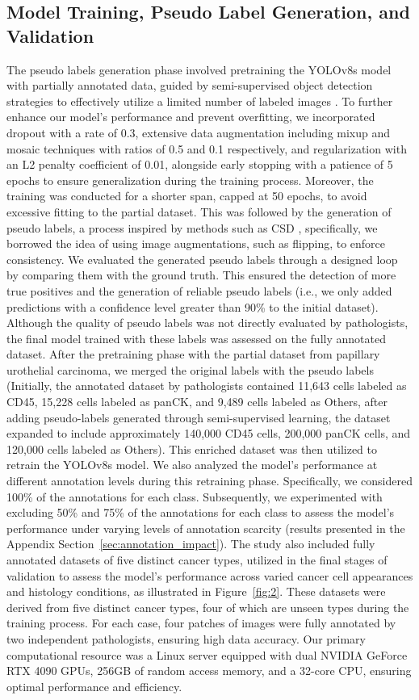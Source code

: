 \documentclass{midl} %
\begin{document}
\subsection{Model Training, Pseudo Label Generation, and Validation}
The pseudo labels generation phase involved pretraining the YOLOv8s model with partially annotated data, guided by semi-supervised object detection strategies to effectively utilize a limited number of labeled images \cite{gao2019note, jeong2019consistency}. To further enhance our model's performance and prevent overfitting, we incorporated dropout with a rate of 0.3, extensive data augmentation including mixup and mosaic techniques with ratios of 0.5 and 0.1 respectively, and regularization with an L2 penalty coefficient of 0.01, alongside early stopping with a patience of 5 epochs to ensure generalization during the training process. Moreover, the training was conducted for a shorter span, capped at 50 epochs, to avoid excessive fitting to the partial dataset. This was followed by the generation of pseudo labels, a process inspired by methods such as CSD \cite{jeong2019consistency}, specifically, we borrowed the idea of using image augmentations, such as flipping, to enforce consistency. We evaluated the generated pseudo labels through a designed loop by comparing them with the ground truth. This ensured the detection of more true positives and the generation of reliable pseudo labels (i.e., we only added predictions with a confidence level greater than 90\% to the initial dataset). Although the quality of pseudo labels was not directly evaluated by pathologists, the final model trained with these labels was assessed on the fully annotated dataset. After the pretraining phase with the partial dataset from papillary urothelial carcinoma, we merged the original labels with the pseudo labels (Initially, the annotated dataset by pathologists contained 11,643 cells labeled as CD45, 15,228 cells labeled as panCK, and 9,489 cells labeled as Others, after adding pseudo-labels generated through semi-supervised learning, the dataset expanded to include approximately 140,000 CD45 cells, 200,000 panCK cells, and 120,000 cells labeled as Others). This enriched dataset was then utilized to retrain the YOLOv8s model. We also analyzed the model's performance at different annotation levels during this retraining phase. Specifically, we considered 100\% of the annotations for each class. Subsequently, we experimented with excluding 50\% and 75\% of the annotations for each class to assess the model's performance under varying levels of annotation scarcity (results presented in the Appendix Section~\ref{sec:annotation_impact}). The study also included fully annotated datasets of five distinct cancer types, utilized in the final stages of validation to assess the model's performance across varied cancer cell appearances and histology conditions, as illustrated in Figure~\ref{fig:2}. These datasets were derived from five distinct cancer types, four of which are unseen types during the training process. For each case, four patches of images were fully annotated by two independent pathologists, ensuring high data accuracy. Our primary computational resource was a Linux server equipped with dual NVIDIA GeForce RTX 4090 GPUs, 256GB of random access memory, and a 32-core CPU, ensuring optimal performance and efficiency.
\end{document}
